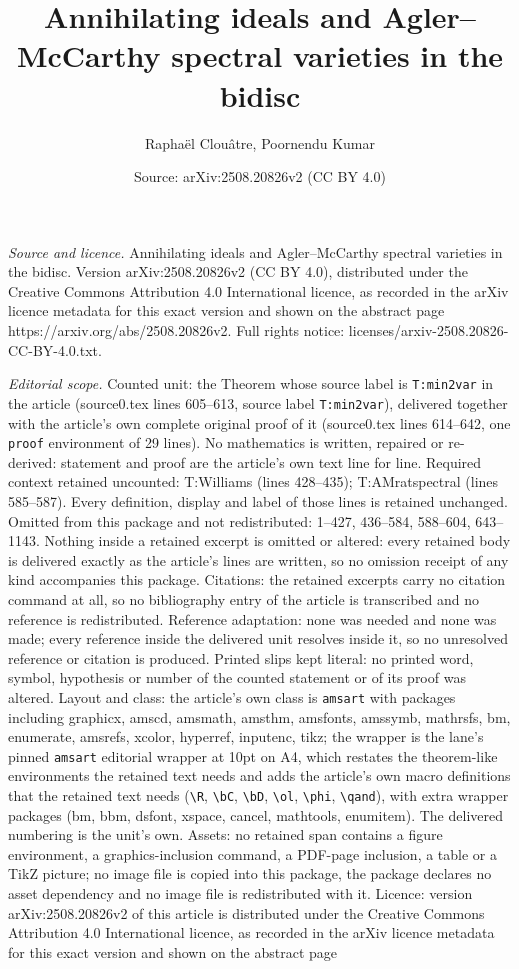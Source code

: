 \documentclass[10pt,a4paper]{amsart}
\title[Annihilating ideals and Agler--McCarthy spectral varieties i]{Annihilating ideals and Agler--McCarthy spectral varieties in the bidisc}
\author{Rapha\"el Clou\^atre, Poornendu Kumar}
\date{Source: arXiv:2508.20826v2 (CC BY 4.0)}
\begin{document}
\maketitle

\noindent\emph{Source and licence.} Annihilating ideals and Agler--McCarthy spectral varieties in the bidisc. Version arXiv:2508.20826v2 (CC BY 4.0), distributed under the Creative Commons Attribution 4.0 International licence, as recorded in the arXiv licence metadata for this exact version and shown on the abstract page https://arxiv.org/abs/2508.20826v2. Full rights notice: licenses/arxiv-2508.20826-CC-BY-4.0.txt.\par\smallskip

\noindent\textit{Editorial scope.} Counted unit: the Theorem whose source label is \texttt{T:min2var} in the article (source0.tex lines 605--613, source label \texttt{T:min2var}), delivered together with the article's own complete original proof of it (source0.tex lines 614--642, one \texttt{proof} environment of 29 lines). No mathematics is written, repaired or re-derived: statement and proof are the article's own text line for line. Required context retained uncounted: T:Williams (lines 428--435); T:AMratspectral (lines 585--587). Every definition, display and label of those lines is retained unchanged. Omitted from this package and not redistributed: 1--427, 436--584, 588--604, 643--1143. Nothing inside a retained excerpt is omitted or altered: every retained body is delivered exactly as the article's lines are written, so no omission receipt of any kind accompanies this package. Citations: the retained excerpts carry no citation command at all, so no bibliography entry of the article is transcribed and no reference is redistributed. Reference adaptation: none was needed and none was made; every reference inside the delivered unit resolves inside it, so no unresolved reference or citation is produced. Printed slips kept literal: no printed word, symbol, hypothesis or number of the counted statement or of its proof was altered. Layout and class: the article's own class is \texttt{amsart} with packages including graphicx, amscd, amsmath, amsthm, amsfonts, amssymb, mathrsfs, bm, enumerate, amsrefs, xcolor, hyperref, inputenc, tikz; the wrapper is the lane's pinned \texttt{amsart} editorial wrapper at 10pt on A4, which restates the theorem-like environments the retained text needs and adds the article's own macro definitions that the retained text needs (\texttt{\textbackslash R}, \texttt{\textbackslash bC}, \texttt{\textbackslash bD}, \texttt{\textbackslash ol}, \texttt{\textbackslash phi}, \texttt{\textbackslash qand}), with extra wrapper packages (bm, bbm, dsfont, xspace, cancel, mathtools, enumitem). The delivered numbering is the unit's own. Assets: no retained span contains a figure environment, a graphics-inclusion command, a PDF-page inclusion, a table or a TikZ picture; no image file is copied into this package, the package declares no asset dependency and no image file is redistributed with it. Licence: version arXiv:2508.20826v2 of this article is distributed under the Creative Commons Attribution 4.0 International licence, as recorded in the arXiv licence metadata for this exact version and shown on the abstract page 
\end{document}
